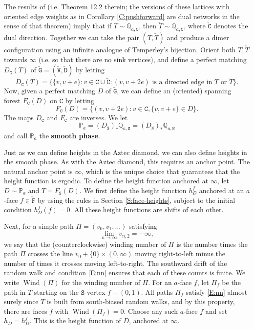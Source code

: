 \documentclass[11pt,twoside]{amsart}
\theoremstyle{plain}
\numberwithin{quest}{section}
\theoremstyle{remark}
\numberwithin{rem}{section}
\theoremstyle{definition}
\newcommand{\Q}{\mathbb{Q}}
\renewcommand{\P}{\mathbb{P}}
\renewcommand{\tt}[1]{{\mathtt{#1}}}
\begin{document}
	The results of \cite{BLPS01} (i.e. Theorem 12.2 therein; the versions of these lattices with oriented edge weights as in Corollary \ref{C:pushforward} are dual networks in the sense of that theorem) imply that if $T \sim \Q_{a, \tt{C}}$, then $\check T \sim \Q_{a, \tt{\check C}}$, where $\tt{\check C}$ denotes the dual direction. Together we can take the pair $(T, \check T)$ and produce a dimer configuration using an infinite analogue of Temperley's bijection. Orient both $T, \check T$ towards $\infty$ (i.e. so that there are no sink vertices), and define a perfect matching $D_{\tt{C}}(T)$ of $\tt{\tilde G} = (\tt{\tilde V}, \tt{\tilde D})$ by letting
	$$
	D_{\tt{C}}(T) = \{\{v, v + e\} : v \in \tt{C} \cup \tt{\check C} : (v, v + 2 e) \text{ is a directed edge in }  T \text{ or } \check T\}.
	$$
	Now, given a perfect matching $D$ of $\tt{\tilde G}$, we can define an (oriented) spanning forest $F_\tt{C}(D)$ on $\tt{\tilde C}$ by letting
	$$
	F_\tt{C}(D) = \{(v, v + 2 e) :  v \in \tt{C}, \{v, v + e\} \in D\}.
	$$
	The maps $D_{\tt{C}}$ and $F_\tt{C}$ are inverses. We let 
$$
\P_a = (D_\tt{S})_* \Q_{a, \tt{S}} = (D_\tt{N})_* \Q_{a, \tt{N}} 
$$
and call $\P_a$ the \textbf{smooth phase}.
	
	Just as we can define heights in the Aztec diamond, we can also define heights in the smooth phase. As with the Aztec diamond, this requires an anchor point. The natural anchor point is $\infty$, which is the unique choice that guarantees that the height function is ergodic. To define the height function anchored at $\infty$, let $D \sim \P_a$ and $T = F_\tt{S} (D)$. We first define the height function $h^f_D$ anchored at an $a$-face $f \in \tt{\tilde F}$ by using the rules in Section \ref{S:face-heights}, subject to the initial condition $h^f_D(f) = 0$. All these height functions are shifts of each other.
	
	Next, for a simple path $\Pi = (v_0, v_1, \dots)$ satisfying 
	\begin{equation}
		\label{E:nn}
		\lim_{n \to \infty} v_{n, 2} = -\infty,
	\end{equation} 
	we say that the (counterclockwise) winding number of $\Pi$ is the number times the path $\Pi$ crosses the line $v_0 + \{0\} \times (0, \infty)$ moving right-to-left minus the number of times it crosses moving left-to-right. The southward drift of the random walk and condition \eqref{E:nn} ensures that each of these counts is finite. We write
	$\operatorname{Wind}(\Pi)$ for the winding number of $\Pi$. For an $a$-face $f$, let $\Pi_f$ be the path in $T$ starting on the $\tt{S}$-vertex $f - (0, 1)$. All paths $\Pi_f$ satisfy \eqref{E:nn} almost surely since $T$ is built from south-biased random walks, and by this property, there are faces $f$ with $\operatorname{Wind}(\Pi_f) = 0$. Choose any such $a$-face $f$ and set $h_D = h_D^f$. This is the height function of $D$, anchored at $\infty$. 
	
\end{document}
